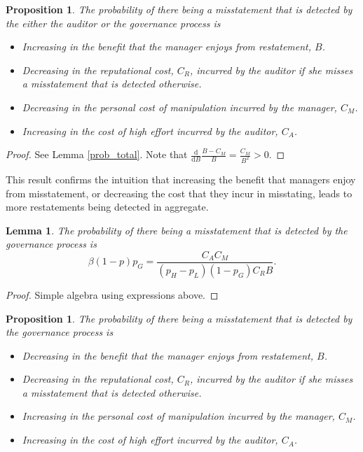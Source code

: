 \documentclass[11pt]{amsart}
\newtheorem{lemma}{Lemma}
\newtheorem{proposition}[theorem]{Proposition}
\begin{document}
\begin{proposition}
The probability of there being a misstatement that is detected by the either the auditor or the governance process is 
\begin{itemize}
\item Increasing in the benefit that the manager enjoys from restatement, $B$.
\item Decreasing in the reputational cost, $C_R$, incurred by the auditor if she misses a misstatement that is detected otherwise.
\item Decreasing in the personal cost of manipulation incurred by the manager, $C_M$.
\item Increasing in the cost of high effort incurred by the auditor, $C_A$.
\end{itemize}
\end{proposition}

\begin{proof}
See Lemma \ref{prob_total}. 
Note that $\frac{\mathrm{d}}{\mathrm{d}B} \frac{B- C_M}{B} = \frac{C_M}{B^2} >0.$
\end{proof}

This result confirms the intuition that increasing the benefit that managers enjoy from misstatement, or decreasing the cost that they incur in misstating, leads to more restatements being detected in aggregate.

\begin{lemma}\label{prob_observed}
The probability of there being a misstatement that is detected by the governance process is 
\[ \beta  (1-p)  p_G = \frac{C_A C_M}{(p_H-p_L) (1 - p_G) C_R  B}. \]
\end{lemma}
\begin{proof}
Simple algebra using expressions above.
\end{proof}

\begin{proposition}\label{cool_result}
The probability of there being a misstatement that is detected by the governance process is 
\begin{itemize}
\item Decreasing in the benefit that the manager enjoys from restatement, $B$.
\item Decreasing in the reputational cost, $C_R$, incurred by the auditor if she misses a misstatement that is detected otherwise.
\item Increasing in the personal cost of manipulation incurred by the manager, $C_M$.
\item Increasing in the cost of high effort incurred by the auditor, $C_A$.
\end{itemize}
\end{proposition}
\end{document}

